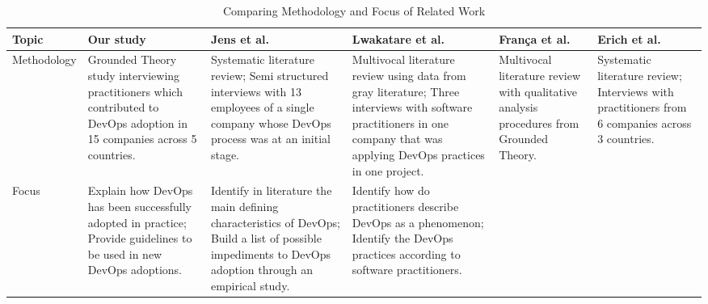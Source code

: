 \begin{table*}[t]
\centering
\caption{Comparing Methodology and Focus of Related Work}
\label{related_work_table}
\begin{tabular}{|p{1.4cm}|p{2.72cm}|p{2.72cm}|p{2.72cm}|p{2.72cm}|p{2.72cm}|}
\toprule
\textbf{Topic} &
\textbf{Our study} &
\textbf{Jens et al.~\cite{devops_a_definition_xp_15}} &
\textbf{Lwakatare et al.~\cite{extending_dimensions_icsea_16}} &
\textbf{Fran\c{c}a et al.~\cite{characterizing_devops_sbes_2016}} &
\textbf{Erich et al.~\cite{qualitative_devops_journalsw_17}} \\ \midrule

Methodology

&
Grounded Theory study interviewing practitioners which contributed to DevOps
adoption in 15 companies across 5 countries.

&
Systematic literature review;
\newline \newline
Semi structured interviews with 13 employees of a single company whose DevOps
process was at an initial stage.

&
Multivocal literature review using data from gray literature;
\newline \newline
Three interviews with software practitioners in one company that was applying
DevOps practices in one project.

&
Multivocal literature review with qualitative analysis procedures from
Grounded Theory.

&
Systematic literature review;
\newline \newline
Interviews with practitioners from 6 companies across 3 countries.


\\ \midrule

Focus
&
Explain how DevOps has been successfully adopted in practice;
\newline \newline
Provide guidelines to be used in new DevOps adoptions.

&
Identify in literature the main defining characteristics of DevOps;
\newline \newline
Build a list of possible impediments to DevOps adoption through an empirical
study.

&
Identify how do practitioners describe DevOps as a phenomenon;
\newline \newline
Identify the DevOps practices according to software practitioners.


\end{tabular}
\end{table*}
